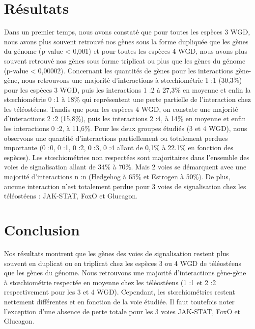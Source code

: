 \section{Résultats}
\par Dans un premier temps, nous avons constaté que pour toutes les espèces 3 WGD, nous avons plus souvent retrouvé nos gènes sous la forme dupliquée que les gènes du génome (p-value < 0,001) et pour toutes les espèces 4 WGD, nous avons plus souvent retrouvé nos gènes sous forme triplicat ou plus que les gènes du génome (p-value < 0,00002). Concernant les quantités de gènes pour les interactions gène-gène, nous retrouvons une majorité d’interactions à stœchiométrie 1 :1 (30,3\%) pour les espèces 3 WGD, puis les interactions 1 :2 à 27,3\% en moyenne et enfin la stœchiométrie 0 :1 à 18\% qui représentent une perte partielle de l’interaction chez les téléostéens. Tandis que pour les espèces 4 WGD, on constate une majorité d’interactions 2 :2 (15,8\%), puis les interactions 2 :4, à 14\% en moyenne et enfin les interactions 0 :2, à 11,6\%. Pour les deux groupes étudiés (3 et 4 WGD), nous observons une quantité d’interactions partiellement ou totalement perdues importante (0 :0, 0 :1, 0 :2, 0 :3, 0 :4 allant de 0,1\% à 22.1\% en fonction des espèces). Les stœchiométries non respectées sont majoritaires dans l’ensemble des voies de signalisation allant de 34\% à 70\%. Mais 2 voies se démarquent avec une majorité d’interactions n :n (Hedgehog à 65\% et Estrogen à 50\%). De plus, aucune interaction n’est totalement perdue pour 3 voies de signalisation chez les téléostéens : JAK-STAT, FoxO et Glucagon. 

\section{Conclusion}
\par Nos résultats montrent que les gènes des voies de signalisation restent plus souvent en duplicat ou en triplicat chez les espèces 3 ou 4 WGD de téléostéens que les gènes du génome. Nous retrouvons une majorité d’interactions gène-gène à stœchiométrie respectée en moyenne chez les téléostéens (1 :1 et 2 :2 respectivement pour les 3 et 4 WGD). Cependant, les stœchiométries restent nettement différentes et en fonction de la voie étudiée. Il faut toutefois noter l’exception d’une absence de perte totale pour les 3 voies JAK-STAT, FoxO et Glucagon. 


